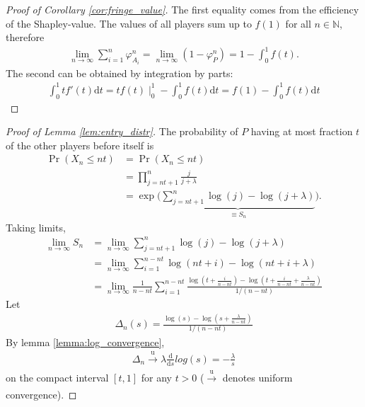 \documentclass[a4paper]{article}
\newcommand{\dt}{\mathrm{d}t}
\begin{document}
\begin{proof}[Proof of Corollary \ref{cor:fringe_value}]
    The first equality comes from the efficiency of the Shapley-value. The values of all players sum up to $f(1)$ for all $n \in \mathbb{N}$, therefore
    \begin{align*}
        \lim_{n \to \infty} \sum_{i=1}^n \varphi_{A_i}^n = \lim_{n \to \infty} (1 - \varphi_P^n ) = 1 - \int_0^1 f(t).
    \end{align*}
    The second can be obtained by integration by parts:
    \begin{align*}
        \int_0^1 t f'(t) \dt = tf(t) \mid_0^1 - \int_0^1 f(t) \dt = f(1) - \int_0^1 f(t) \dt
    \end{align*}
\end{proof}

\begin{proof}[Proof of Lemma \ref{lem:entry_distr}] %
    The probability of $P$ having at most fraction $t$ of the other players before itself is
    \begin{align*}
        \Pr(X_n \leq nt) &= \Pr(X_n \leq nt ) \\
        &= \prod_{j = nt + 1}^n \frac{j}{j + \lambda} \\
        &= \exp \Bigg( \underbrace{\sum_{j = nt + 1}^n \log(j) - \log(j+\lambda)}_{\equiv S_n} \Bigg).
    \end{align*}
    Taking limits,
    \begin{align*}
        \lim_{n \to \infty} S_n &= \lim_{n \to \infty} \sum_{j = nt + 1}^n \log(j) - \log(j+\lambda) \\
        &= \lim_{n \to \infty} \sum_{i = 1}^{n - nt} \log(nt + i) - \log(nt + i + \lambda) \\
        &= \lim_{n \to \infty} \frac{1}{n - nt} \sum_{i = 1}^{n - nt} \frac{\log \left( t + \frac{i}{n - nt} \right) - \log \left( t + \frac{i}{n - nt} + \frac{\lambda}{n - nt} \right)}{1 / (n - nt)}
    \end{align*}
    Let
    \begin{align*}
        \Delta_n(s) = \frac{\log \left( s \right) - \log \left( s + \frac{\lambda}{n - nt} \right)}{1 / (n - nt)}
    \end{align*}
    By lemma \ref{lemma:log_convergence}, 
    \begin{align*}
        \Delta_n \xrightarrow[]{\mathrm{u}} \lambda \frac{\mathrm{d}}{\mathrm{d}s}log(s) = -\frac{\lambda}{s}
    \end{align*}
    on the compact interval $[t, 1]$ for any $t > 0$ ($\xrightarrow[]{\mathrm{u}}$ denotes uniform convergence).
    

\end{proof}
\end{document}
